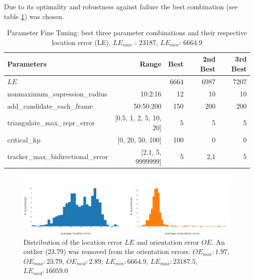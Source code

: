 \medskip

Due to its optimality and robustness against failure the best combination (see table \ref{table:significant-param-tuning}) was chosen.

\begin{table}[htp]
	\centering
	\caption{Parameter Fine Tuning: best three parameter combinations and their respective location error (LE). $LE_{max}$ : 23187, $LE_{min}$: 6664.9}
	\label{table:significant-param-tuning}
	\begin{tabular}{lrrrr}
		\hline
		\textbf{Parameters}                &         \textbf{Range} & \textbf{Best} & \textbf{2nd Best} & \textbf{3rd Best} \\ \hline
		$LE$                &                        &          6664 &              6987 &              7207 \\ \hline\hline
		nonmaximum\_supression\_radius     &                10:2:16 &            12 &                10 &                10 \\ \hline
		add\_candidate\_each\_frame        &              50:50:200 &           150 &               200 &               200 \\ \hline
		triangulate\_max\_repr\_error      & [0.5, 1, 2, 5, 10, 20] &             5 &                 5 &                 5 \\ \hline
		critical\_kp                       &       [0, 20, 50, 100] &           100 &                 0 &                 0 \\ \hline
		tracker\_max\_bidirectional\_error &      [2.1, 5, 9999999] &             5 &               2,1 &                 5 \\ \hline
	\end{tabular}
\end{table}

\begin{figure}[htp]
	\centering
	\includegraphics[width=1\textwidth]{figures/error_histogram}
	\caption{Distribution of the location error $LE$ and orientation error $OE$. 
	An outlier (23.79) was removed from the orientation errors. 
		$OE_{min}: 1.97$, 
		$OE_{max}: 23.79$,
		$OE_{med}: 2.89$,
		$LE_{min}: 6664.9$,
		$LE_{max}: 23187.5$,
		$LE_{med}: 16059.0$}
	\label{fig:error_histogram}
\end{figure}

